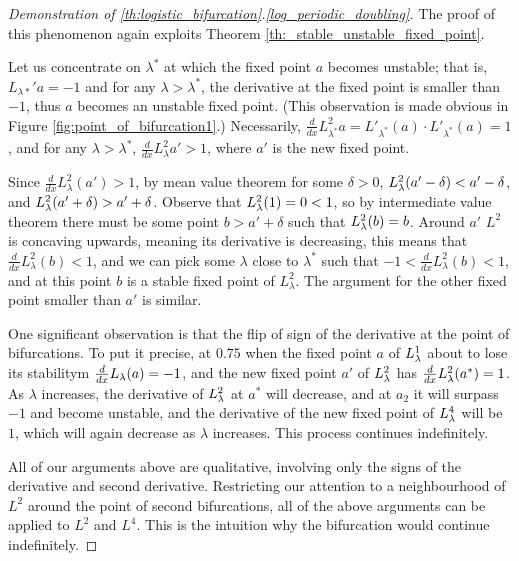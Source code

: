 \begin{proof}[Demonstration of \ref{th:logistic_bifurcation}.\ref{log_periodic_doubling}]
	The proof of this phenomenon again exploits Theorem \ref{th:_stable_unstable_fixed_point}.

	Let us concentrate on $\lambda^*$ at which the fixed point $a$ becomes unstable; that is, $L_{\lambda*}' a  = - 1$ and for any $\lambda > \lambda^*$, the derivative at the fixed point is smaller than $-1$, thus $a$ becomes an unstable fixed point. (This observation is made obvious in Figure \ref{fig:point_of_bifurcation1}.)
	Necessarily, $\frac{d}{dx}L_{\lambda^*}^2 a = L'_{\lambda^*}(a) \cdot L'_{\lambda^*}(a) = 1$,
	and for any $\lambda > \lambda^*$, $\frac{d}{dx}L_{\lambda}^2a'> 1$, where $a'$ is the new fixed point.

	Since $\frac{d}{dx}L_{\lambda}^2(a') > 1$, by mean value theorem for some $\delta > 0$, $L_{\lambda}^2(a' - \delta) < a' - \delta$, and $L_{\lambda}^2(a' + \delta) > a' + \delta$. 
	Observe that $L_{\lambda}^2(1) = 0 < 1$, so by intermediate value theorem there must be some point $b > a' + \delta$ such that $L_{\lambda}^2(b) = b$. 
	Around $a'$ $L^2$ is concaving upwards, meaning its derivative is decreasing, this means that $\frac{d}{dx }L_{\lambda}^2(b) < 1$,
	and we can pick some $\lambda$  close to $\lambda ^*$ such that $-1<\frac{d}{dx }L_{\lambda}^2(b) < 1$, and at this point $b$ is a stable fixed point of $L_{\lambda}^2$.
	The argument for the other fixed point smaller than $a'$ is similar. 

	One significant observation is that the flip of sign of the derivative at the point of bifurcations. 
	To put it precise, at $0.75$ when the fixed point $a$ of $L_{\lambda}^1$ about to lose its stabilitym $\frac{d}{dx} L_{\lambda}(a) = - 1$, and the new fixed point $a'$ of $L_{\lambda}^2$ has $\frac{d}{dx} L_{\lambda}^2(a^*) = 1$. 
	As $\lambda$ increases, the derivative of $L_{\lambda}^2$ at $a^*$ will decrease, and at $a_2$ it will surpass $-1$ and become unstable, and the derivative of the new fixed point of $L_{\lambda}^4$ will be $1$, which will again decrease as $\lambda$ increases.
	This process continues indefinitely.

	All of our arguments above are qualitative, involving only the signs of the derivative and second derivative. 
	Restricting our attention to a neighbourhood of $L^2$ around the point of second bifurcations, all of the above arguments can be applied to $L^2$ and $L^4$. 
	This is the intuition why the bifurcation would continue indefinitely.
	

\end{proof}
